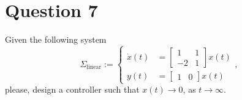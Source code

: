 \documentclass[11pt,a4paper,titlepage]{article}
\begin{document}
\section{Question 7}
Given the following system
\begin{equation}
	\Sigma_{\text{linear}} := \begin{cases}
		\dot x(t) &= \begin{bmatrix}1 & 1 \\ -2 & 1\end{bmatrix}x(t) \\
			y(t) &= \begin{bmatrix}1 & 0\end{bmatrix}x(t)
	\end{cases},
\label{eq: sigmalin}
\end{equation}
please, design a controller such that $x(t) \to 0$, as $t\to\infty$.
\end{document}
